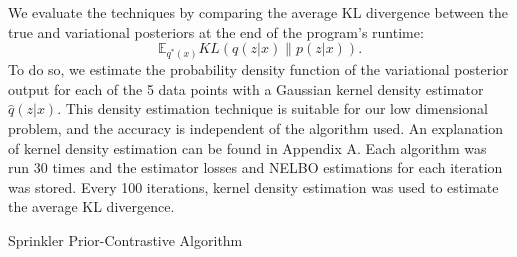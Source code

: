 \documentclass[honours,12pt]{unswthesis}
\newcommand{\E}{\mathbb{E}}
\numberwithin{equation}{section}
\theoremstyle{definition}
\begin{document}
We evaluate the techniques by comparing the average KL divergence between the true and variational posteriors at the end of the program's runtime: \[\E_{q^*(x)}KL(q(z|x)\|p(z|x)).\] To do so, we estimate the probability density function of the variational posterior output for each of the 5 data points with a Gaussian kernel density estimator $\hat{q}(z|x)$. This density estimation technique is suitable for our low dimensional problem, and the accuracy is independent of the algorithm used. An explanation of kernel density estimation can be found in Appendix A. Each algorithm was run 30 times and the estimator losses and NELBO estimations for each iteration was stored. Every 100 iterations, kernel density estimation was used to estimate the average KL divergence.
\begin{algorithm}
\caption{Sprinkler Prior-Contrastive Algorithm}
\BlankLine
{}
\end{algorithm}
\end{document}
